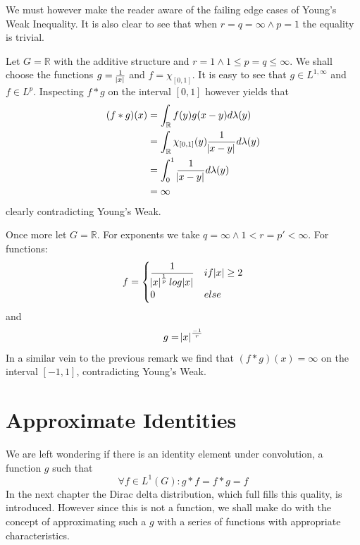 We must however make the reader aware of the failing edge cases of Young's Weak Inequality. It is also clear to see that when $r=q=\infty \wedge p=1$ the equality is trivial.

\begin{remark}
Let $G=\mathbb{R}$ with the additive structure and $r=1 \wedge 1\leq p =q \leq \infty$. We shall choose the functions $g=\frac{1}{\abs{x}}$ and $f=\chi_{[0,1]}$. It is easy to see that $g \in L^{1,\infty}$ and $f \in L^p$. Inspecting $f \ast g$ on the interval $[0,1]$ however yields that
\begin{align*}
(f \ast g)(x) &= \int_\mathbb{R} f(y)g(x-y) d\lambda(y)\\
&= \int_\mathbb{R} \chi_{[0,1]}(y) \frac{1}{\abs{x-y}} d\lambda(y) \\
&= \int_0^1 \frac{1}{\abs{x-y}} d\lambda(y) \\
&= \infty
\end{align*} 
clearly contradicting Young's Weak.
\end{remark}

\begin{remark}
Once more let $G=\mathbb{R}$. For exponents we take $q = \infty \wedge 1<r = p' < \infty.$ For functions:
\begin{equation*}
f = 
\begin{cases}
\displaystyle
\frac{1}{\abs{x}^\frac{1}{p} log\abs{x}} & if \abs{x} \geq 2 \\
\displaystyle
0 & else
\end{cases} 
\end{equation*}
and
\begin{equation*}
g = \abs{x}^\frac{-1}{r}
\end{equation*}
In a similar vein to the previous remark we find that $(f \ast g)(x) = \infty$ on the interval $[-1,1]$, contradicting Young's Weak.
\end{remark}



\section{Approximate Identities}

We are left wondering if there is an identity element under convolution, a function $g$ such that 
\begin{equation*}
\forall f \in L^1(G): g \ast f = f \ast g = f
\end{equation*}
In the next chapter the Dirac delta distribution, which full fills this quality, is introduced. However since this is not a function, we shall make do with the concept of approximating such a $g$ with a series of functions with appropriate characteristics.

